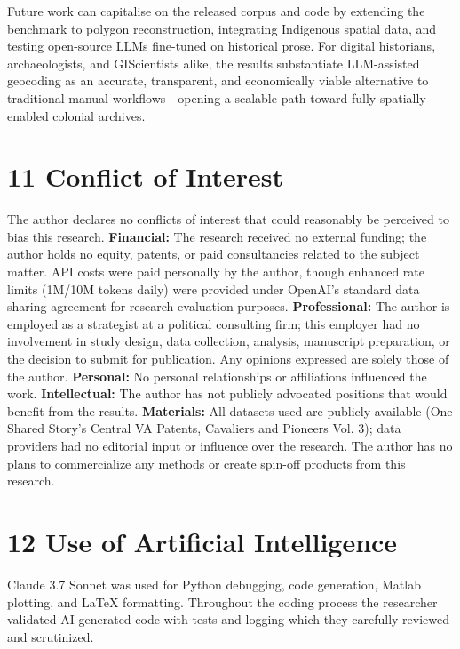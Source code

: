 \documentclass[
  10pt]{article}
\begin{document}
Future work can capitalise on the released corpus and code by extending
the benchmark to polygon reconstruction, integrating Indigenous spatial
data, and testing open-source LLMs fine-tuned on historical prose. For
digital historians, archaeologists, and GIScientists alike, the results
substantiate LLM-assisted geocoding as an accurate, transparent, and
economically viable alternative to traditional manual
workflows---opening a scalable path toward fully spatially enabled
colonial archives.

\section{11 Conflict of Interest}\label{conflict-of-interest}

The author declares no conflicts of interest that could reasonably be
perceived to bias this research. \textbf{Financial:} The research
received no external funding; the author holds no equity, patents, or
paid consultancies related to the subject matter. API costs were paid
personally by the author, though enhanced rate limits (1M/10M tokens
daily) were provided under OpenAI's standard data sharing agreement for
research evaluation purposes. \textbf{Professional:} The author is
employed as a strategist at a political consulting firm; this employer
had no involvement in study design, data collection, analysis,
manuscript preparation, or the decision to submit for publication. Any
opinions expressed are solely those of the author. \textbf{Personal:} No
personal relationships or affiliations influenced the work.
\textbf{Intellectual:} The author has not publicly advocated positions
that would benefit from the results. \textbf{Materials:} All datasets
used are publicly available (One Shared Story's Central VA Patents,
Cavaliers and Pioneers Vol. 3); data providers had no editorial input or
influence over the research. The author has no plans to commercialize
any methods or create spin-off products from this research.

\section{12 Use of Artificial
Intelligence}\label{use-of-artificial-intelligence}

Claude 3.7 Sonnet was used for Python debugging, code generation, Matlab
plotting, and LaTeX formatting. Throughout the coding process the
researcher validated AI generated code with tests and logging which they
carefully reviewed and scrutinized.
\end{document}
